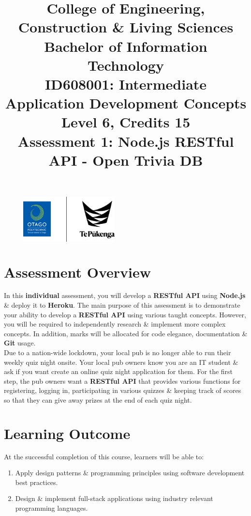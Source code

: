 \documentclass{article}
\author{}
\begin{document}
\begin{figure}
	\centering
	\includegraphics[width=50mm]{../../resources/img/logo.png}
\end{figure}

\title{College of Engineering, Construction \& Living Sciences\\Bachelor of Information Technology\\ID608001: Intermediate Application Development Concepts\\Level 6, Credits 15\\\textbf{Assessment 1: Node.js RESTful API - Open Trivia DB}}
\date{}
\maketitle

\section*{Assessment Overview}
In this \textbf{individual} assessment, you will develop a \textbf{RESTful API} using \textbf{Node.js} \& deploy it to \textbf{Heroku}. The main purpose of this assessment is to demonstrate your ability to develop a \textbf{RESTful API} using various taught concepts. However, you will be required to independently research \& implement more complex concepts. In addition, marks will be allocated for code elegance, documentation \& \textbf{Git} usage.\\

Due to a nation-wide lockdown, your local pub is no longer able to run their weekly quiz night onsite. Your local pub owners know you are an IT student \& ask if you want create an online quiz night application for them. For the first step, the pub owners want a \textbf{RESTful API} that provides various functions for registering, logging in, participating in various quizzes \& keeping track of scores so that they can give away prizes at the end of each quiz night.

\section*{Learning Outcome}
At the successful completion of this course, learners will be able to:
\begin{enumerate}
	\item Apply design patterns \& programming principles using software development best practices.
	\item Design \& implement full-stack applications using industry relevant programming languages.
\end{enumerate}
\end{document}
